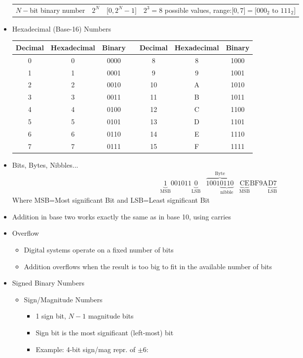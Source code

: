 \documentclass[a4paper]{article}
\begin{document}
\begin{itemize}
\begin{tabularx}{15cm}{X|X|X|X|}
$N-$bit binary number & $2^N$ & $\lbrack 0,2^{N}-1\rbrack$ & $2^3=8$ possible values, range:$\lbrack 0,7\rbrack=\lbrack 000_2\text{ to }111_2\rbrack$\\
\end{tabularx}
\item Hexadecimal (Base-16) Numbers\\
\begin{tabular}{c|c|c|c|c|c|c}
Decimal & Hexadecimal & Binary&{}&Decimal & Hexadecimal & Binary\\\hline
0&0&0000&{}&8&8&1000\\
1&1&0001&{}&9&9&1001\\
2&2&0010&{}&10&A&1010\\
3&3&0011&{}&11&B&1011\\
4&4&0100&{}&12&C&1100\\
5&5&0101&{}&13&D&1101\\
6&6&0110&{}&14&E&1110\\
7&7&0111&{}&15&F&1111\\
\end{tabular}
\item Bits, Bytes, Nibbles...
\[\begin{array}{*{20}{c}}
{\underbrace 1_{{\text{MSB}}}001011\underbrace 0_{{\text{LSB}}}}&{\overbrace {1001\underbrace {0110}_{{\text{nibble}}}}^{{\text{Byte}}}}&{\underbrace {{\text{CE}}}_{{\text{MSB}}}{\text{BF9A}}\underbrace {{\text{D7}}}_{{\text{LSB}}}}
\end{array}\]
Where MSB=Most significant Bit and LSB=Least significant Bit
\item Addition in base two works exactly the same as in base 10, using carries
\item Overflow
\begin{itemize}
\item Digital systems operate on a fixed number of bits
\item Addition overflows when the result is too big to fit in the available number of bits
\end{itemize}
\item Signed Binary Numbers
\begin{itemize}
\item Sign/Magnitude Numbers
\begin{itemize}
\item 1 sign bit, $N-1$ magnitude bits
\item Sign bit is the most significant (left-most) bit
\item Example: 4-bit sign/mag repr. of $\pm 6$:

\end{itemize}
\end{itemize}
\end{itemize}
\end{document}
